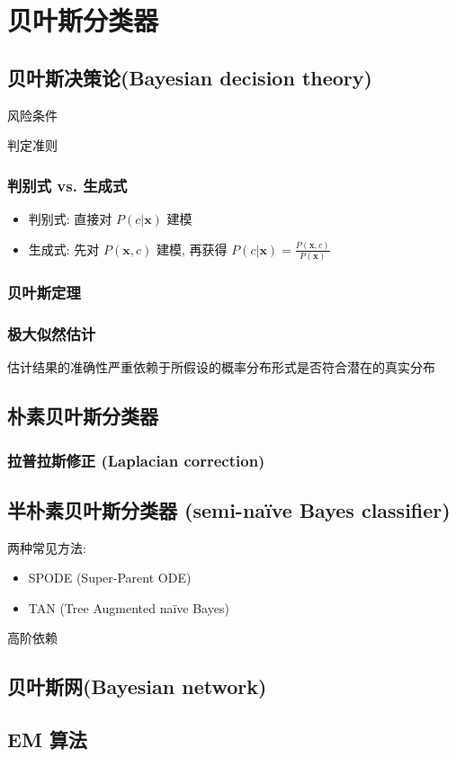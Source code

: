 \newpage
\section{贝叶斯分类器}
\subsection{贝叶斯决策论(Bayesian decision theory)}
风险条件

判定准则

\subsubsection{判别式 vs. 生成式}
\begin{itemize}
    \item 判别式: 直接对 $P(c|\bm x)$ 建模
    \item 生成式: 先对 $P(\bm x,c)$ 建模, 再获得 $\displaystyle P(c|\bm x)=\frac{P(\bm x, c)}{P(\bm x)}$
\end{itemize}

\subsubsection{贝叶斯定理}


\subsubsection{极大似然估计}
估计结果的准确性严重依赖于所假设的概率分布形式是否符合潜在的真实分布


\subsection{朴素贝叶斯分类器}



\subsubsection{拉普拉斯修正 (Laplacian correction)}



\subsection{半朴素贝叶斯分类器 (semi-naïve Bayes classifier)}


两种常见方法:
\begin{itemize}
    \item SPODE (Super-Parent ODE)
    \item TAN (Tree Augmented naïve Bayes)
\end{itemize}

高阶依赖

\subsection{贝叶斯网(Bayesian network)}

\subsection{EM 算法}